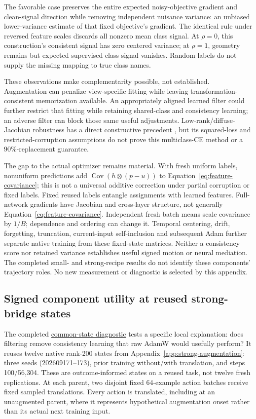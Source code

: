 \documentclass[10pt]{article}
\newcommand{\Cov}{\operatorname{Cov}}
\newcommand{\src}[2]{\href{../../../#1}{#2}}
\begin{document}
The favorable case preserves the entire expected noisy-objective gradient and clean-signal direction while removing independent nuisance variance: an unbiased lower-variance estimate of that fixed objective's gradient. The identical rule under reversed feature scales discards all nonzero mean class signal. At $\rho=0$, this construction's consistent signal has zero centered variance; at $\rho=1$, geometry remains but expected supervised class signal vanishes. Random labels do not supply the missing mapping to true class names.

These observations make complementarity possible, not established. Augmentation can penalize view-specific fitting while leaving transformation-consistent memorization available. An appropriately aligned learned filter could further restrict that fitting while retaining shared-class and consistency learning; an adverse filter can block those same useful adjustments. Low-rank/diffuse-Jacobian robustness has a direct constructive precedent \citep[Theorems 2.2 and 4.1]{li2020earlystopping}, but its squared-loss and restricted-corruption assumptions do not prove this multiclass-CE method or a 90\%-replacement guarantee.

The gap to the actual optimizer remains material. With fresh uniform labels, nonuniform predictions add $\Cov(h\otimes(p-u))$ to Equation~\eqref{eq:feature-covariance}; this is not a universal additive correction under partial corruption or fixed labels. Fixed reused labels entangle assignments with learned features. Full-network gradients have Jacobian and cross-layer structure, not generally Equation~\eqref{eq:feature-covariance}. Independent fresh batch means scale covariance by $1/B$; dependence and ordering can change it. Temporal centering, drift, forgetting, truncation, current-input self-inclusion and subsequent Adam further separate native training from these fixed-state matrices. Neither a consistency score nor retained variance establishes useful signed motion or neural mediation. The completed small- and strong-recipe results do not identify these components' trajectory roles. No new measurement or diagnostic is selected by this appendix.

\clearpage
\subsection{Signed component utility at reused strong-bridge states}\label{app:component-utility}
The completed \src{output/2026-09-10-spectral-component-utility/results.md}{common-state diagnostic} tests a specific local explanation: does filtering remove consistency learning that raw AdamW would usefully perform? It reuses twelve native rank-200 states from Appendix~\ref{app:strong-augmentation}: three seeds (202609171--173), prior training without/with translation, and steps 100/56,304. These are outcome-informed states on a reused task, not twelve fresh replications. At each parent, two disjoint fixed 64-example action batches receive fixed sampled translations. Every action is translated, including at an unaugmented parent, where it represents hypothetical augmentation onset rather than its actual next training input.
\end{document}
